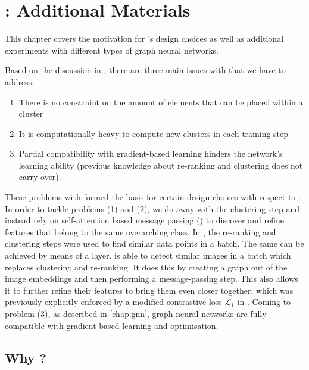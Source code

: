 \chapter{\samptr{}: Additional Materials}\label{chap:samptr-additional-mat}

This chapter covers the motivation for \samptr{}'s design choices as well as additional experiments with different types of graph neural networks.

Based on the discussion in , there are three main issues with \ccclr{} that we have to address:
\begin{enumerate}
    \item There is no constraint on the amount of elements that can be placed within a cluster
    \item It is computationally heavy to compute new clusters in each training step 
    \item Partial compatibility with gradient-based learning hinders the network's learning ability (previous knowledge about re-ranking and clustering does not carry over).
\end{enumerate}

These problems with \ccclr{} formed the basis for certain design choices with respect to \samptr{}. In order to tackle problems (1) and (2), we do away with the clustering step and instead rely on self-attention based message passing (\samp{}) to discover and refine features that belong to the same overarching class. 
In \ccclr{}, the re-ranking and clustering steps were used to find similar data points in a batch. The same can be achieved by means of a \samp{} layer. \samp{} is able to detect similar images in a batch which replaces clustering and re-ranking. It does this by creating a graph out of the image embeddings and then performing a message-passing step. This also allows it to further refine their features to bring them even closer together, which was previously explicitly enforced by a modified contrastive loss $\mathcal{L}_1$ in \ccclr{}.
Coming to problem (3), as described in \cref{chap:gnn}, graph neural networks are fully compatible with gradient based learning and optimisation. 


\section{Why \samp{}?}\label{sec:why-samp}

